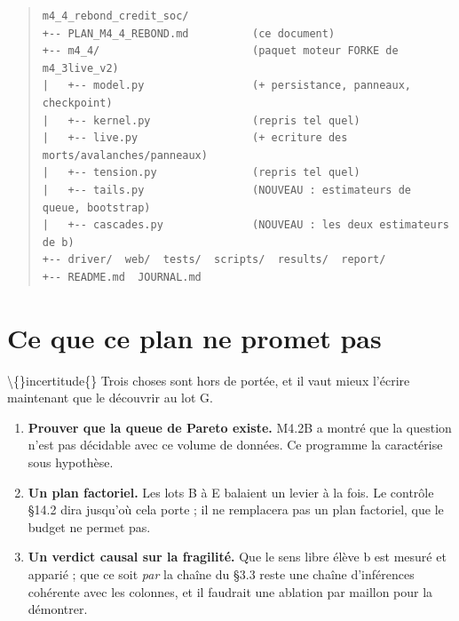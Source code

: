 \documentclass[11pt,a4paper]{article}
\begin{document}
\begin{quote}\footnotesize
\begin{verbatim}
m4_4_rebond_credit_soc/
+-- PLAN_M4_4_REBOND.md          (ce document)
+-- m4_4/                        (paquet moteur FORKE de m4_3live_v2)
|   +-- model.py                 (+ persistance, panneaux, checkpoint)
|   +-- kernel.py                (repris tel quel)
|   +-- live.py                  (+ ecriture des morts/avalanches/panneaux)
|   +-- tension.py               (repris tel quel)
|   +-- tails.py                 (NOUVEAU : estimateurs de queue, bootstrap)
|   +-- cascades.py              (NOUVEAU : les deux estimateurs de b)
+-- driver/  web/  tests/  scripts/  results/  report/
+-- README.md  JOURNAL.md
\end{verbatim}
\end{quote}

\bigskip

\setcounter{section}{11}
\section{Ce que ce plan ne promet pas}

\textbackslash\{\}incertitude\{\} Trois choses sont hors de portée, et il vaut mieux l'écrire maintenant que le découvrir au lot G.

\begin{enumerate}
\item \textbf{Prouver que la queue de Pareto existe.} M4.2B a montré que la question n'est pas décidable avec ce volume de données. Ce programme la caractérise sous hypothèse.
\item \textbf{Un plan factoriel.} Les lots B à E balaient un levier à la fois. Le contrôle §14.2 dira jusqu'où cela porte ; il ne remplacera pas un plan factoriel, que le budget ne permet pas.
\item \textbf{Un verdict causal sur la fragilité.} Que le sens libre élève b est mesuré et apparié ; que ce soit \emph{par} la chaîne du §3.3 reste une chaîne d'inférences cohérente avec les colonnes, et il faudrait une ablation par maillon pour la démontrer.
\end{enumerate}
\end{document}
